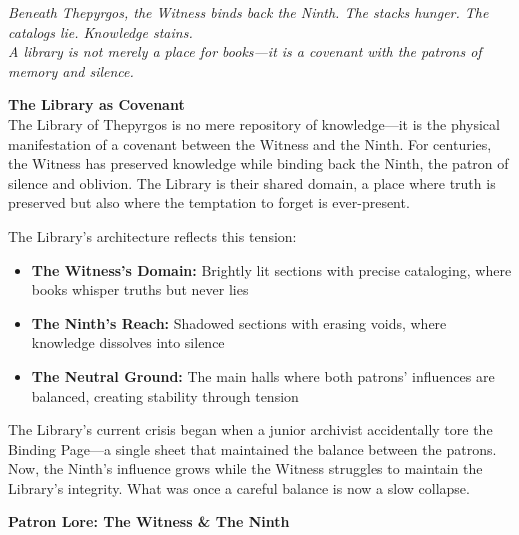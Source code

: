 \documentclass[10pt,letterpaper]{article}
\newcommand{\sectionheader}[1]{\vspace{0.5em}\textbf{\large #1}\\[0.3em]}
\begin{document}



\begin{center}
\textit{Beneath Thepyrgos, the Witness binds back the Ninth. The stacks hunger. The catalogs lie. Knowledge stains.\\
A library is not merely a place for books---it is a covenant with the patrons of memory and silence.}
\end{center}

\sectionheader{The Library as Covenant}
The Library of Thepyrgos is no mere repository of knowledge---it is the physical manifestation of a covenant between the Witness and the Ninth. For centuries, the Witness has preserved knowledge while binding back the Ninth, the patron of silence and oblivion. The Library is their shared domain, a place where truth is preserved but also where the temptation to forget is ever-present.

The Library's architecture reflects this tension:
\begin{itemize}
    \item \textbf{The Witness's Domain:} Brightly lit sections with precise cataloging, where books whisper truths but never lies
    \item \textbf{The Ninth's Reach:} Shadowed sections with erasing voids, where knowledge dissolves into silence
    \item \textbf{The Neutral Ground:} The main halls where both patrons' influences are balanced, creating stability through tension
\end{itemize}

The Library's current crisis began when a junior archivist accidentally tore the Binding Page---a single sheet that maintained the balance between the patrons. Now, the Ninth's influence grows while the Witness struggles to maintain the Library's integrity. What was once a careful balance is now a slow collapse.

\sectionheader{Patron Lore: The Witness \& The Ninth}
\end{document}
